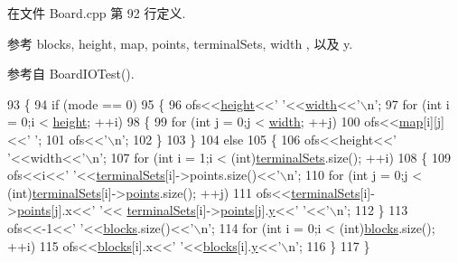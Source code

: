 在文件 Board.\+cpp 第 92 行定义.



参考 blocks, height, map, points, terminal\+Sets, width , 以及 y.



参考自 Board\+I\+O\+Test().


\begin{DoxyCode}
93 \{
94     \textcolor{keywordflow}{if} (mode == 0)
95     \{
96         ofs<<\hyperlink{classBoard_aa0cb8de0254520dc08dab5796643c8e5}{height}<<\textcolor{charliteral}{' '}<<\hyperlink{classBoard_a90a8efaa4736af25511ac948bdd27d6c}{width}<<\textcolor{charliteral}{'\(\backslash\)n'};
97         \textcolor{keywordflow}{for} (\textcolor{keywordtype}{int} i = 0;i < \hyperlink{classBoard_aa0cb8de0254520dc08dab5796643c8e5}{height}; ++i)
98         \{
99             \textcolor{keywordflow}{for} (\textcolor{keywordtype}{int} j = 0;j < \hyperlink{classBoard_a90a8efaa4736af25511ac948bdd27d6c}{width}; ++j)
100                 ofs<<\hyperlink{classBoard_a191ff45df9151b8fee0c32877f582165}{map}[i][j]<<\textcolor{charliteral}{' '};
101             ofs<<\textcolor{charliteral}{'\(\backslash\)n'};
102         \}
103     \}
104     \textcolor{keywordflow}{else}
105     \{
106         ofs<<height<<\textcolor{charliteral}{' '}<<width<<\textcolor{charliteral}{'\(\backslash\)n'};
107         \textcolor{keywordflow}{for} (\textcolor{keywordtype}{int} i = 1;i < (int)\hyperlink{classBoard_a6683a9c042af7113f55c5bc1b9656b69}{terminalSets}.size(); ++i)
108         \{
109             ofs<<i<<\textcolor{charliteral}{' '}<<\hyperlink{classBoard_a6683a9c042af7113f55c5bc1b9656b69}{terminalSets}[i]->points.size()<<\textcolor{charliteral}{'\(\backslash\)n'};
110             \textcolor{keywordflow}{for} (\textcolor{keywordtype}{int} j = 0;j < (int)\hyperlink{classBoard_a6683a9c042af7113f55c5bc1b9656b69}{terminalSets}[i]->\hyperlink{classes_8txt_ae368e6252d0add75ea011d5d90db68ed}{points}.size(); ++j)
111                 ofs<<\hyperlink{classBoard_a6683a9c042af7113f55c5bc1b9656b69}{terminalSets}[i]->\hyperlink{classes_8txt_ae368e6252d0add75ea011d5d90db68ed}{points}[j].x<<\textcolor{charliteral}{' '}<<
      \hyperlink{classBoard_a6683a9c042af7113f55c5bc1b9656b69}{terminalSets}[i]->\hyperlink{classes_8txt_ae368e6252d0add75ea011d5d90db68ed}{points}[j].\hyperlink{classes_8txt_a52673b1e0cce0104e52dcd12727f211e}{y}<<\textcolor{charliteral}{' '}<<\textcolor{charliteral}{'\(\backslash\)n'};
112         \}
113         ofs<<-1<<\textcolor{charliteral}{' '}<<\hyperlink{classBoard_abd553dee0125b79f672dbfa74f86c52b}{blocks}.size()<<\textcolor{charliteral}{'\(\backslash\)n'};
114         \textcolor{keywordflow}{for} (\textcolor{keywordtype}{int} i = 0;i < (int)\hyperlink{classBoard_abd553dee0125b79f672dbfa74f86c52b}{blocks}.size(); ++i)
115             ofs<<\hyperlink{classBoard_abd553dee0125b79f672dbfa74f86c52b}{blocks}[i].x<<\textcolor{charliteral}{' '}<<\hyperlink{classBoard_abd553dee0125b79f672dbfa74f86c52b}{blocks}[i].\hyperlink{classes_8txt_a52673b1e0cce0104e52dcd12727f211e}{y}<<\textcolor{charliteral}{'\(\backslash\)n'};
116     \}
117 \}\end{DoxyCode}



